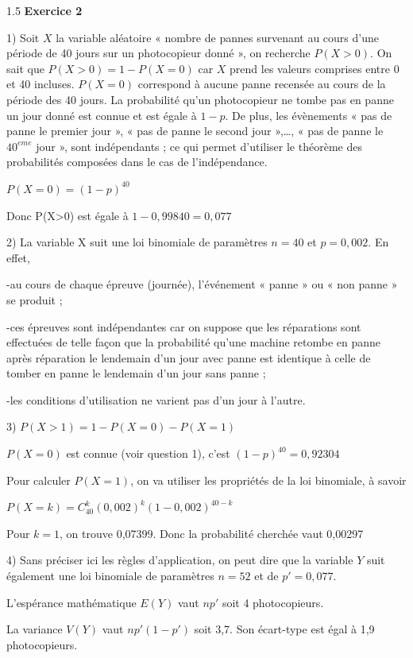 \documentclass[12pt]{article}
\begin{document}
\begin{spacing}{1.5}
\medskip\textbf{Exercice 2}

 1) Soit $X$ la variable aléatoire « nombre de pannes survenant au cours d'une période de 40 jours sur un photocopieur donné », on recherche $P(X>0)$.
 On sait que $P(X>0)=1-P(X=0)$ car $X$ prend les valeurs comprises entre 0 et 40 incluses. $P(X=0)$ correspond à aucune panne recensée au cours de la
 période des 40 jours. La probabilité qu'un photocopieur ne tombe pas en panne un jour donné est connue et est égale à $1-p$. De plus, les
 évènements « pas de panne le premier jour », « pas de panne le second
 jour »,…, « pas de panne le ${40}^{eme}$ jour », sont indépendants ; ce qui permet d'utiliser le théorème des probabilités composées dans le cas de l'indépendance.
 
 $P(X=0)=(1-p)^{40}$
 
 Donc P(X>0) est égale à $1-0,99840 = 0,077$
 
 2) La variable X suit une loi binomiale de paramètres $n=40$ et $p=0,002$. En effet,
 
 -au cours de chaque épreuve (journée), l'événement « panne » ou « non panne » se produit ;
 
 -ces épreuves sont indépendantes car on suppose que les réparations sont effectuées de telle façon que la probabilité qu'une machine retombe en
 panne après réparation le lendemain d'un jour avec panne est identique à celle de tomber en panne le lendemain d'un jour sans panne ;
 
 -les conditions d'utilisation ne varient pas d'un jour à l'autre.
 
 3) $P(X>1)=1-P(X=0)-P(X=1)$
 
 $P(X=0)$ est connue (voir question 1), c'est $(1-p)^{40}=0,92304$
 
 Pour calculer $P(X=1)$, on va utiliser les propriétés de la loi binomiale, à savoir
 
 $P(X = k) =C_{40}^k (0,002)^k(1-0,002)^{40-k}$
 
 Pour $k=1$, on trouve 0,07399. Donc la probabilité cherchée vaut 0,00297
 
 4) Sans préciser ici les règles d'application, on peut dire que la variable $Y$ suit également une loi binomiale de paramètres $n=52$ et de $p'=0,077$.
 
 L'espérance mathématique $E(Y)$ vaut $np'$ soit 4 photocopieurs.
 
 La variance $V(Y)$ vaut $np'(1-p')$ soit 3,7. Son écart-type est égal à 1,9 photocopieurs.




\end{spacing}
\end{document}
